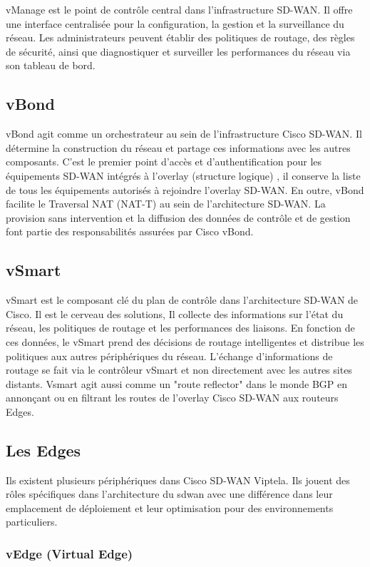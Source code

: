 vManage est le point de contrôle central dans l'infrastructure SD-WAN. Il offre une interface centralisée pour la configuration, la gestion et la surveillance du réseau. Les administrateurs peuvent établir des politiques de routage, des règles de sécurité, ainsi que diagnostiquer et surveiller les performances du réseau via son tableau de bord.

\subsection{vBond }

vBond agit comme un orchestrateur au sein de l'infrastructure Cisco SD-WAN. Il détermine la construction du réseau et partage ces informations avec les autres composants. C'est le premier point d'accès et d'authentification pour les équipements SD-WAN intégrés à l'overlay (structure logique) , il conserve la liste de tous les équipements autorisés à rejoindre l'overlay SD-WAN. En outre, vBond facilite le Traversal NAT (NAT-T) au sein de l'architecture SD-WAN. La provision sans intervention et la diffusion des données de contrôle et de gestion font  partie des responsabilités assurées par Cisco vBond.

\subsection{vSmart }
vSmart est le composant clé du plan de contrôle dans l'architecture SD-WAN de Cisco. Il est le cerveau des solutions, Il collecte des informations sur l'état du réseau, les politiques de routage et les performances des liaisons. En fonction de ces données, le vSmart prend des décisions de routage intelligentes et distribue les politiques aux autres périphériques du réseau. L'échange d'informations de routage se fait via le contrôleur vSmart et non directement avec les autres sites distants. Vsmart  agit  aussi comme un "route reflector" dans le monde BGP en annonçant ou en filtrant les routes de l’overlay Cisco SD-WAN aux routeurs Edges.
\subsection{Les Edges }

Ils existent plusieurs périphériques dans Cisco SD-WAN Viptela. Ils jouent des rôles spécifiques dans l'architecture du sdwan avec une différence dans leur emplacement de déploiement et leur optimisation pour des environnements particuliers.
\subsubsection{   vEdge  (Virtual Edge) }

